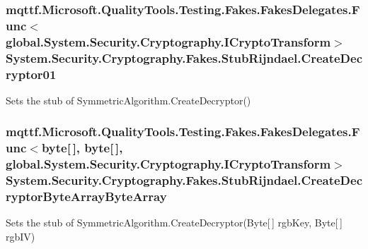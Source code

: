 \hypertarget{class_system_1_1_security_1_1_cryptography_1_1_fakes_1_1_stub_rijndael_a8175e839f34c16ad8513222e493abea2}{
\subsubsection[{Create\-Decryptor01}]{\setlength{\rightskip}{0pt plus 5cm}mqttf.\-Microsoft.\-Quality\-Tools.\-Testing.\-Fakes.\-Fakes\-Delegates.\-Func$<$global.\-System.\-Security.\-Cryptography.\-I\-Crypto\-Transform$>$ System.\-Security.\-Cryptography.\-Fakes.\-Stub\-Rijndael.\-Create\-Decryptor01}}\label{class_system_1_1_security_1_1_cryptography_1_1_fakes_1_1_stub_rijndael_a8175e839f34c16ad8513222e493abea2}


Sets the stub of Symmetric\-Algorithm.\-Create\-Decryptor()

\hypertarget{class_system_1_1_security_1_1_cryptography_1_1_fakes_1_1_stub_rijndael_ae222874ee4da83feedca9d022b2fd574}{
\subsubsection[{Create\-Decryptor\-Byte\-Array\-Byte\-Array}]{\setlength{\rightskip}{0pt plus 5cm}mqttf.\-Microsoft.\-Quality\-Tools.\-Testing.\-Fakes.\-Fakes\-Delegates.\-Func$<$byte\mbox{[}$\,$\mbox{]}, byte\mbox{[}$\,$\mbox{]}, global.\-System.\-Security.\-Cryptography.\-I\-Crypto\-Transform$>$ System.\-Security.\-Cryptography.\-Fakes.\-Stub\-Rijndael.\-Create\-Decryptor\-Byte\-Array\-Byte\-Array}}\label{class_system_1_1_security_1_1_cryptography_1_1_fakes_1_1_stub_rijndael_ae222874ee4da83feedca9d022b2fd574}


Sets the stub of Symmetric\-Algorithm.\-Create\-Decryptor(\-Byte\mbox{[}$\,$\mbox{]} rgb\-Key, Byte\mbox{[}$\,$\mbox{]} rgb\-I\-V)

